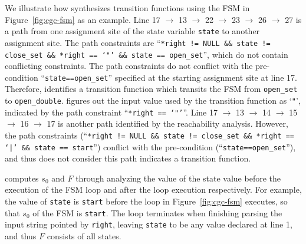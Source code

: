 We illustrate how \Tool{} synthesizes transition functions using 
the FSM in Figure~\ref{fig:cgc-fsm} as an example. 
Line 17 $\rightarrow$ 13 $\rightarrow$ 22 $\rightarrow$ 23 $\rightarrow$ 26 $\rightarrow$ 27
is a path from one assignment site of the state variable \texttt{state} 
to another assignment site. 
The path constraints are 
``\texttt{*right != NULL \&\& state != close\_set \&\& *right == `"' \&\& state == open\_set}'', 
which do not contain conflicting constraints. 
The path constraints do not conflict with the pre-condition ``\texttt{state==open\_set}'' 
specified at the starting assignment site at line 17.
Therefore, \Tool{} identifies a transition function which transits the FSM from  
\texttt{open\_set} to \texttt{open\_double}. 
\Tool{} figures out the input value used by the 
transition function as `\texttt{"}', 
indicated by the path 
constraint ``\texttt{*right == `"'}''.  
Line 17 $\rightarrow$ 13 $\rightarrow$ 14 $\rightarrow$ 15 
$\rightarrow$ 16 $\rightarrow$ 17
is another path identified by the reachability analysis. 
However, the path constraints (``\texttt{*right != NULL \&\& state != close\_set \&\& *right == `|' \&\& state == start}'') 
conflict 
with the pre-condition (``\texttt{state==open\_set}''), 
and thus \Tool{} does not consider this path indicates a transition function. 



\Tool{} computes $s_0$ and $F$ through analyzing the value of 
the state value before the execution of the 
FSM loop and after the loop execution respectively. 
For example, the value of \texttt{state} is \texttt{start} before the loop in Figure~\ref{fig:cgc-fsm} executes, 
so that $s_0$ of the FSM is \texttt{start}.
The loop terminates when finishing 
parsing the input string pointed by \texttt{right},
leaving \texttt{state} to be any value declared at line 1, 
and thus $F$ consists of all states. 







